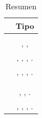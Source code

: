 

\begin{table}[H]
    \centering
\begin{tabular}{ |l|c| }

\hline
	&
	Tipo \frameworkPC%


\\ \hline
	\derbyNAMEref &
	\isomorphicJSFwASref%
	
\\ \hline
	\socketStreamNAMEref &
	\socketStreamNAMEref, \emberjsNAME, \nodejsNAME%
	
\\ \hline
	\meanstackNAMEref &
	\mongodbNAME, \expressjsNAME, \angularjsNAME, \nodejsNAME.%
	
\\ \hline
	\meenstackNAMEref &
	\mongodbNAME, \emberjsNAME, \expressjsNAME, \nodejsNAME.%
 
\\ \hline
	\meteorNAMEref &
	\isomorphicJSFwASref%
	
\\ \hline
	\mojitoNAMEref &
	\isomorphicJSFwASref%
	
\\ \hline
	\saneNAMEref &
	\sailsNAME, \emberjsNAME, \nodejsNAME. %
	
	
\\ \hline
	\sleekjsNAMEref &
	\handlebarsNAME, \expressjsNAME, \mongooseNAME, \nodejsNAME.%
	

\\ \hline
\end{tabular}
    \caption{Resumen \fullStackJSFwASref}
    \label{tab:resume_full_stack_javaScript}
\end{table}
